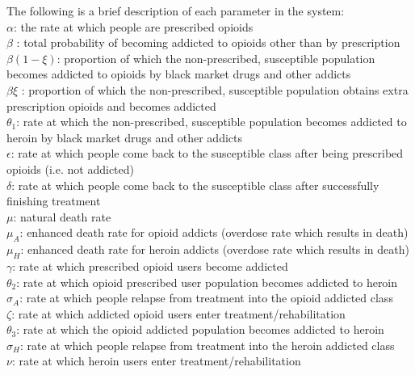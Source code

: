 \documentclass[12pt]{article}
\begin{document}
The following is a brief description of each parameter in the system: \\
$\alpha$: the rate at which people are prescribed opioids \\
$\beta$ : total probability of becoming addicted to opioids other than by prescription \\
$\beta(1-\xi)$: proportion of which the non-prescribed, susceptible population becomes addicted to opioids by black market drugs and other addicts \\
$\beta \xi$ : proportion of which the non-prescribed, susceptible population obtains extra prescription opioids and becomes addicted  \\
$\theta_1$: rate at which the non-prescribed, susceptible population becomes addicted to heroin by black market drugs and other addicts  \\
$\epsilon$: rate at which people come back to the susceptible class after being prescribed opioids (i.e. not addicted)\\
$\delta$: rate at which people come back to the susceptible class after successfully finishing treatment \\
$\mu$: natural death rate \\
$\mu_A$: enhanced death rate for opioid addicts (overdose rate which results in death) \\
$\mu_H$: enhanced death rate for heroin addicts (overdose rate which results in death) \\
$\gamma$: rate at which prescribed opioid users become addicted \\
$\theta_2$: rate at which opioid prescribed user population becomes addicted to heroin \\
$\sigma_A$: rate at which people relapse from treatment into the opioid addicted class \\
$\zeta$: rate at which addicted opioid users enter treatment/rehabilitation \\
$\theta_3$: rate at which the opioid addicted population becomes addicted to heroin \\
$\sigma_H$: rate at which people relapse from treatment into the heroin addicted class \\
$\nu$: rate at which heroin users enter treatment/rehabilitation \\ \\
\end{document}
